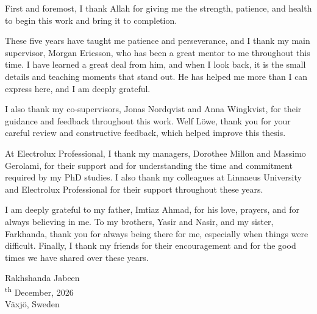 \begin{acknowledgments}
\null

First and foremost, I thank Allah for giving me the strength, patience, and health to begin this work and bring it to completion.

These five years have taught me patience and perseverance, and I thank my main supervisor, Morgan Ericsson, who has been a great mentor to me throughout this time. I have learned a great deal from him, and when I look back, it is the small details and teaching moments that stand out. He has helped me more than I can express here, and I am deeply grateful.

I also thank my co-supervisors, Jonas Nordqvist and Anna Wingkvist, for their guidance and feedback throughout this work. Welf L\"owe, thank you for your careful review and constructive feedback, which helped improve this thesis.

At Electrolux Professional, I thank my managers, Dorothee Millon and Massimo Gerolami, for their support and for understanding the time and commitment required by my PhD studies. I also thank my colleagues at Linnaeus University and Electrolux Professional for their support throughout these years.

I am deeply grateful to my father, Imtiaz Ahmad, for his love, prayers, and for always believing in me. To my brothers, Yasir and Nasir, and my sister, Farkhanda, thank you for always being there for me, especially when things were difficult. Finally, I thank my friends for their encouragement and for the good times we have shared over these years.

\bigskip
\vfill
\noindent Rakhshanda Jabeen\\
\textsuperscript{th} December, 2026\\
\noindent V\"axj\"o, Sweden\\
\bigskip

\end{acknowledgments}
\cleardoublepage
